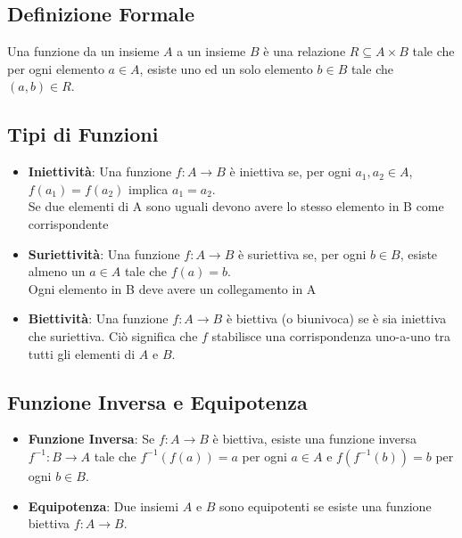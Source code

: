 \documentclass{article}
\begin{document}
\subsection{Definizione Formale}
Una funzione da un insieme $A$ a un insieme $B$ è una relazione $R \subseteq A \times B$ tale che per ogni elemento $a \in A$, esiste uno ed un solo elemento $b \in B$ tale che $(a, b) \in R$.

\subsection{Tipi di Funzioni}
\begin{itemize}
\item \textbf{Iniettività}: Una funzione $f: A \rightarrow B$ è iniettiva se, per ogni $a_1, a_2 \in A$, $f(a_1) = f(a_2)$ implica $a_1 = a_2$. \\ Se due elementi di A sono uguali devono avere lo stesso elemento in B come corrispondente
\item \textbf{Suriettività}: Una funzione $f: A \rightarrow B$ è suriettiva se, per ogni $b \in B$, esiste almeno un $a \in A$ tale che $f(a) = b$. \\ Ogni elemento in B deve avere un collegamento in A
\item \textbf{Biettività}: Una funzione $f: A \rightarrow B$ è biettiva (o biunivoca) se è sia iniettiva che suriettiva. Ciò significa che $f$ stabilisce una corrispondenza uno-a-uno tra tutti gli elementi di $A$ e $B$.
\end{itemize}

\subsection{Funzione Inversa e Equipotenza}
\begin{itemize}
\item \textbf{Funzione Inversa}: Se $f: A \rightarrow B$ è biettiva, esiste una funzione inversa $f^{-1}: B \rightarrow A$ tale che $f^{-1}(f(a)) = a$ per ogni $a \in A$ e $f(f^{-1}(b)) = b$ per ogni $b \in B$.
\item \textbf{Equipotenza}: Due insiemi $A$ e $B$ sono equipotenti se esiste una funzione biettiva $f: A \rightarrow B$.
\end{itemize}
\end{document}
